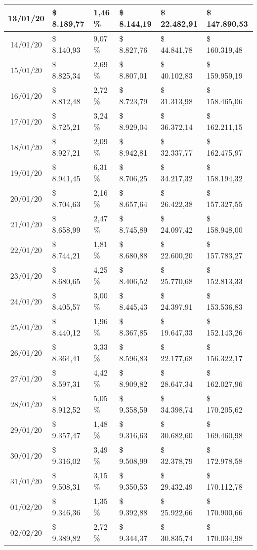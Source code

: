 \begin{small}
\begin{longtable}{|c|l|l|l|l|l|}
13/01/20 & \$ 8.189,77 & 1,46 \% & \$ 8.144,19 & \$ 22.482,91 & \$ 147.890,53 \\ \hline
14/01/20 & \$ 8.140,93 & 9,07 \% & \$ 8.827,76 & \$ 44.841,78 & \$ 160.319,48 \\ \hline
15/01/20 & \$ 8.825,34 & 2,69 \% & \$ 8.807,01 & \$ 40.102,83 & \$ 159.959,19 \\ \hline
16/01/20 & \$ 8.812,48 & 2,72 \% & \$ 8.723,79 & \$ 31.313,98 & \$ 158.465,06 \\ \hline
17/01/20 & \$ 8.725,21 & 3,24 \% & \$ 8.929,04 & \$ 36.372,14 & \$ 162.211,15 \\ \hline
18/01/20 & \$ 8.927,21 & 2,09 \% & \$ 8.942,81 & \$ 32.337,77 & \$ 162.475,97 \\ \hline
19/01/20 & \$ 8.941,45 & 6,31 \% & \$ 8.706,25 & \$ 34.217,32 & \$ 158.194,32 \\ \hline
20/01/20 & \$ 8.704,63 & 2,16 \% & \$ 8.657,64 & \$ 26.422,38 & \$ 157.327,55 \\ \hline
21/01/20 & \$ 8.658,99 & 2,47 \% & \$ 8.745,89 & \$ 24.097,42 & \$ 158.948,00 \\ \hline
22/01/20 & \$ 8.744,21 & 1,81 \% & \$ 8.680,88 & \$ 22.600,20 & \$ 157.783,27 \\ \hline
23/01/20 & \$ 8.680,65 & 4,25 \% & \$ 8.406,52 & \$ 25.770,68 & \$ 152.813,33 \\ \hline
24/01/20 & \$ 8.405,57 & 3,00 \% & \$ 8.445,43 & \$ 24.397,91 & \$ 153.536,83 \\ \hline
25/01/20 & \$ 8.440,12 & 1,96 \% & \$ 8.367,85 & \$ 19.647,33 & \$ 152.143,26 \\ \hline
26/01/20 & \$ 8.364,41 & 3,33 \% & \$ 8.596,83 & \$ 22.177,68 & \$ 156.322,17 \\ \hline
27/01/20 & \$ 8.597,31 & 4,42 \% & \$ 8.909,82 & \$ 28.647,34 & \$ 162.027,96 \\ \hline
28/01/20 & \$ 8.912,52 & 5,05 \% & \$ 9.358,59 & \$ 34.398,74 & \$ 170.205,62 \\ \hline
29/01/20 & \$ 9.357,47 & 1,48 \% & \$ 9.316,63 & \$ 30.682,60 & \$ 169.460,98 \\ \hline
30/01/20 & \$ 9.316,02 & 3,49 \% & \$ 9.508,99 & \$ 32.378,79 & \$ 172.978,58 \\ \hline
31/01/20 & \$ 9.508,31 & 3,15 \% & \$ 9.350,53 & \$ 29.432,49 & \$ 170.112,78 \\ \hline
01/02/20 & \$ 9.346,36 & 1,35 \% & \$ 9.392,88 & \$ 25.922,66 & \$ 170.900,66 \\ \hline
02/02/20 & \$ 9.389,82 & 2,72 \% & \$ 9.344,37 & \$ 30.835,74 & \$ 170.034,98 \\ \hline

\end{longtable}
\end{small}
